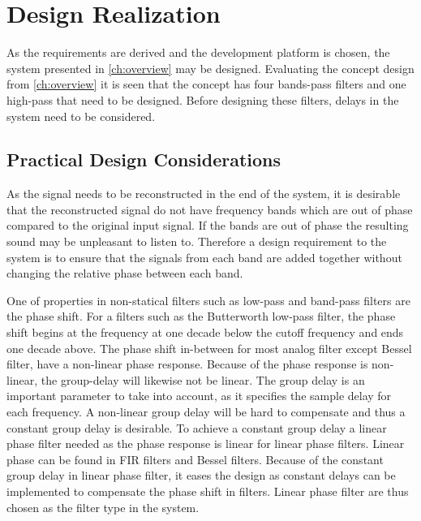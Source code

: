 \chapter{Design Realization} \label{ch:designRealization}
As the requirements are derived and the development platform is chosen, the system presented in \autoref{ch:overview} may be designed. Evaluating the concept design from \autoref{ch:overview} it is seen that the concept has four bands-pass filters and one high-pass that need to be designed. Before designing these filters, delays in the system need to be considered. 


\section{Practical Design Considerations}
As the signal needs to be reconstructed in the end of the system, it is desirable that the reconstructed signal do not have frequency bands which are out of phase compared to the original input signal. If the bands are out of phase the resulting sound may be unpleasant to listen to. Therefore a design requirement to the system is to ensure that the signals from each band are added together without changing the relative phase between each band.

One of properties in non-statical filters such as low-pass and band-pass filters are the phase shift. For a filters such as the Butterworth low-pass filter, the phase shift begins at the frequency at one decade below the cutoff frequency and ends one decade above. The phase shift in-between for most analog filter except Bessel filter, have a non-linear phase response. Because of the phase response is non-linear, the group-delay will likewise not be linear. The group delay is an important parameter to take into account, as it specifies the sample delay for each frequency. A non-linear group delay will be hard to compensate and thus a constant group delay is desirable. To achieve a constant group delay a linear phase filter needed as the phase response is linear for linear phase filters. Linear phase can be found in FIR filters and Bessel filters. Because of the constant group delay in linear phase filter, it eases the design as constant delays can be implemented to compensate the phase shift in filters. Linear phase filter are thus chosen as the filter type in the system.

